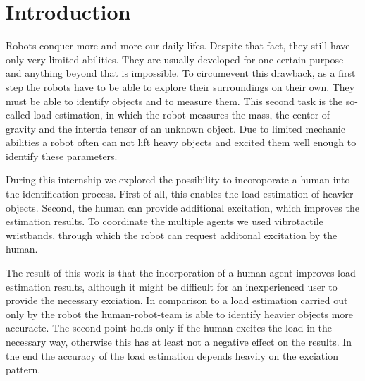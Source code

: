 

\chapter{Introduction}
Robots conquer more and more our daily lifes. Despite that fact, they still have only very limited abilities. They are usually developed for one certain purpose and anything beyond that is impossible. To circumevent this drawback, as a first step the robots have to be able to explore their surroundings on their own. They must be able to identify objects and to measure them. This second task is the so-called load estimation, in which the robot measures the mass, the center of gravity and the intertia tensor of an unknown object. Due to limited mechanic abilities a robot often can not lift heavy objects and excited them well enough to identify these parameters.

During this internship we explored the possibility to incoroporate a human into the identification process. First of all, this enables the load estimation of heavier objects. Second, the human can provide additional excitation, which improves the estimation results. To coordinate the multiple agents we used vibrotactile wristbands, through which the robot can request additonal excitation by the human.

The result of this work is that the incorporation of a human agent improves load estimation results, although it might be difficult for an inexperienced user to provide the necessary exciation. In comparison to a load estimation carried out only by the robot the human-robot-team is able to identify heavier objects more accuracte. The second point holds only if the human excites the load in the necessary way, otherwise this has at least not a negative effect on the results. In the end the accuracy of the load estimation depends heavily on the exciation pattern.
